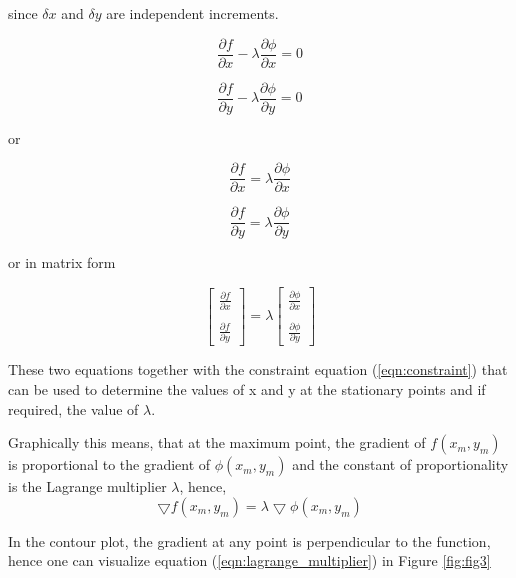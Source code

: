 \documentclass[]{article}
\begin{document}
since $ \delta x$ and  $\delta y$ are independent increments.

\begin{equation}
\frac{\partial f}{\partial x} - \lambda \frac{\partial \phi}{\partial x} = 0
\end{equation}

\begin{equation}
\frac{\partial f}{\partial y} - \lambda \frac{\partial \phi}{\partial y} = 0
\end{equation}

or 

\begin{equation}
\label{eqn:lang_f_x}
\frac{\partial f}{\partial x} = \lambda \frac{\partial \phi}{\partial x}
\end{equation}

\begin{equation}
\label{eqn:lang_f_y}
\frac{\partial f}{\partial y} = \lambda \frac{\partial \phi}{\partial y}
\end{equation}

or in matrix form

\[
\begin{bmatrix}
\frac{\partial f}{\partial x}\\ \\
\frac{\partial f}{\partial y}
\end{bmatrix}
=
\lambda
\begin{bmatrix}
\frac{\partial \phi}{\partial x}\\ \\
\frac{\partial \phi}{\partial y}
\end{bmatrix}
\]

These two equations together with the constraint equation (\ref{eqn:constraint}) that can be used to determine the values of x and y at the stationary points and if required, the value of $\lambda$.

Graphically this means, that at the maximum point, the gradient of $f(x_m,y_m)$ is proportional to the gradient of $\phi(x_m,y_m)$ and the constant of proportionality is the Lagrange multiplier $\lambda$, hence,
\begin{equation}
\label{eqn:lagrange_multiplier}
\bigtriangledown f(x_m,y_m) = \lambda \bigtriangledown  \phi(x_m,y_m)
\end{equation}

In the contour plot, the gradient at any point is perpendicular to the function, hence one can visualize equation (\ref{eqn:lagrange_multiplier}) in Figure \ref{fig:fig3}
\end{document}

